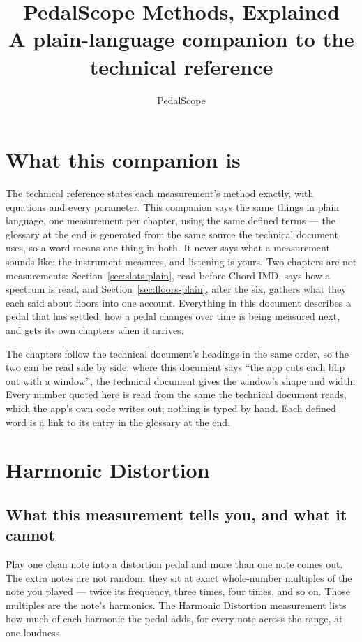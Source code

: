 \documentclass[11pt,a4paper]{article}
\title{PedalScope Methods, Explained\\\large A plain-language companion to the technical reference}
\author{PedalScope}
\date{\releasestamp}
\begin{document}
\maketitle
\licenceline
\tableofcontents
\clearpage

\section{What this companion is}
The technical reference states each measurement's method exactly, with
equations and every parameter. This companion says the same things in
plain language, one measurement per chapter, using the same defined terms
--- the glossary at the end is generated from the same source the technical
document uses, so a word means one thing in both. It never says what a
measurement sounds like: the instrument measures, and listening is yours.
Two chapters are not measurements: Section~\ref{sec:slots-plain}, read
before Chord IMD, says how a spectrum is read, and
Section~\ref{sec:floors-plain}, after the six, gathers what they each
said about floors into one account.
Everything in this document describes a pedal that has settled; how a
pedal changes over time is being measured next, and gets its own chapters
when it arrives.

The chapters follow the technical document's headings in the same order,
so the two can be read side by side: where this document says ``the app
cuts each blip out with a window'', the technical document gives the
window's shape and width. Every number quoted here is read from the same
 the technical document reads, which the app's own code
writes out; nothing is typed by hand. Each defined word is a link to its
entry in the glossary at the end.

\section{Harmonic Distortion}
\label{sec:hd-plain}

\subsection{What this measurement tells you, and what it cannot}

Play one clean note into a distortion pedal and more than one note comes
out. The extra notes are not random: they sit at exact whole-number
multiples of the note you played --- twice its frequency, three times,
four times, and so on. Those multiples are the note's harmonics. The
Harmonic Distortion measurement lists how much of each harmonic the pedal
adds, for every note across the range, at one loudness.
\end{document}
